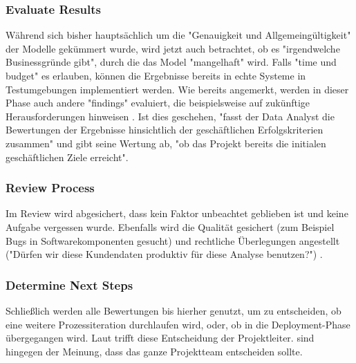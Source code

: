 \subsubsection{Evaluate Results}
Während sich bisher hauptsächlich um die "Genauigkeit und Allgemeingültigkeit" der Modelle gekümmert wurde, wird jetzt auch betrachtet, ob es "irgendwelche Businessgründe gibt", durch die das Model "mangelhaft"\citep[S.~18; eigene Übersetzung]{shearer_crisp-dm_2000} wird. Falls "time und budget"\citep[S.~26]{chapman_crisp-dm_2000} es erlauben, können die Ergebnisse bereits in echte Systeme in Testumgebungen implementiert werden. Wie bereits angemerkt, werden in dieser Phase auch andere "findings" evaluiert, die beispielsweise auf zukünftige Herausforderungen hinweisen \citep[S.~18]{shearer_crisp-dm_2000}. Ist dies geschehen, "fasst der Data Analyst die Bewertungen der Ergebnisse hinsichtlich der geschäftlichen Erfolgskriterien zusammen" und gibt seine Wertung ab, "ob das Projekt bereits die initialen geschäftlichen Ziele erreicht"\citep[S.~18; eigene Übersetzung]{shearer_crisp-dm_2000}.

\subsubsection{Review Process}
Im Review wird abgesichert, dass kein Faktor unbeachtet geblieben ist und keine Aufgabe vergessen wurde. Ebenfalls wird die Qualität gesichert (zum Beispiel Bugs in Softwarekomponenten gesucht) und rechtliche Überlegungen angestellt ("Dürfen wir diese Kundendaten produktiv für diese Analyse benutzen?") .

\subsubsection{Determine Next Steps}
Schließlich werden alle Bewertungen bis hierher genutzt, um zu entscheiden, ob eine weitere Prozessiteration durchlaufen wird, oder, ob in die Deployment-Phase übergegangen wird. Laut \citep[S.~18]{shearer_crisp-dm_2000} trifft diese Entscheidung der Projektleiter. \citep[S.~17]{chapman_crisp-dm_2000} sind hingegen der Meinung, dass das ganze Projektteam entscheiden sollte.

